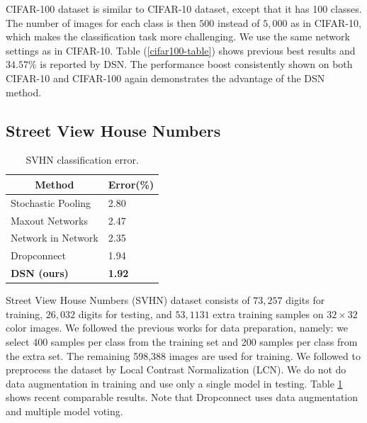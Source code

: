 \documentclass{article} %
\begin{document}
CIFAR-100 dataset is similar to CIFAR-10 dataset, except that it has 100 classes. The number of images for each class is then $500$ instead of $5,000$ as in CIFAR-10,  which makes the classification task more challenging. We use the same network settings as in CIFAR-10. Table (\ref{cifar100-table}) shows previous best results and $34.57\%$ is reported by DSN. The performance boost consistently shown on both CIFAR-10 and CIFAR-100 again demonstrates the advantage of the DSN method.

\vspace{-3mm}
\subsection{Street View House Numbers}
\vspace{-3mm}

\begin{table}[!htp]
\vspace{-5mm}
			\centering
			\begin{tabular}{ll}
			\multicolumn{1}{c}{\bf Method}  &\multicolumn{1}{c}{\bf Error(\%)} 
			\\ \hline
			Stochastic Pooling  \cite{SPool} &2.80 \\
			Maxout Networks     \cite{maxout} &2.47 \\
			Network in Network  \cite{NIN} &2.35 \\
			Dropconnect    \cite{dropcon}    & 1.94 \\
			\textbf{DSN (ours)}   			 &\textbf{1.92} \\
			\end{tabular}
  \caption{SVHN classification error.}
	\label{svhn-table}
\end{table}

Street View House Numbers (SVHN) dataset consists of $73,257$ digits for training, $26,032$ digits for testing, and $53,1131$ extra training samples on $32 \times 32$ color images. We followed the previous works for data preparation, namely: we select 400 samples per class from the training set and 200 samples per class from the extra set. The remaining 598,388 images are used for training. We followed \cite{maxout} to preprocess the dataset by Local Contrast Normalization (LCN). We do not do data augmentation in training and use only a single model in testing. Table \ref{svhn-table} shows recent comparable results.  Note that Dropconnect \cite{dropcon} uses data augmentation and multiple model voting.
\end{document}
